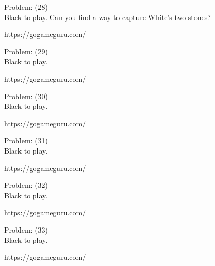 \documentclass[11pt]{article}
\begin{document}
\begin{minipage}[t]{0.5\textwidth}
  {\centering
  
Problem: (28)\\
Black to play. Can you find a way to capture White's two stones?

https://gogameguru.com/\\
  }
\end{minipage}
\begin{minipage}[t]{0.5\textwidth}
  {\centering
  
Problem: (29)\\
Black to play.

https://gogameguru.com/\\
  }
\end{minipage}
\begin{minipage}[t]{0.5\textwidth}
  {\centering
  
Problem: (30)\\
Black to play.

https://gogameguru.com/\\
  }
\end{minipage}
\begin{minipage}[t]{0.5\textwidth}
  {\centering
  
Problem: (31)\\
Black to play.

https://gogameguru.com/\\
  }
\end{minipage}
\begin{minipage}[t]{0.5\textwidth}
  {\centering
  
Problem: (32)\\
Black to play.

https://gogameguru.com/\\
  }
\end{minipage}
\begin{minipage}[t]{0.5\textwidth}
  {\centering
  
Problem: (33)\\
Black to play.

https://gogameguru.com/\\
  }
\end{minipage}
\end{document}
